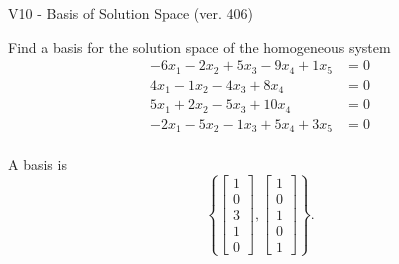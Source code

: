 \begin{exercise}
  \begin{exerciseTitle}V10 - Basis of Solution Space (ver. 406)\end{exerciseTitle}
  \begin{exerciseStatement}
    Find a basis for the solution space of the homogeneous system 
\begin{align*}
 -6 x_ 1 -2 x_ 2 + 5 x_ 3 -9 x_ 4 + 1 x_ 5 &= 0  \\ 
  4 x_ 1 -1 x_ 2 -4 x_ 3 + 8 x_ 4 &= 0  \\ 
  5 x_ 1 + 2 x_ 2 -5 x_ 3 + 10 x_ 4 &= 0  \\ 
  -2 x_ 1 -5 x_ 2 -1 x_ 3 + 5 x_ 4 + 3 x_ 5 &= 0  \\ 
 \end{align*}


 
  \end{exerciseStatement}

  \begin{exerciseAnswer}
   A basis is   
\[\left\{\left[\begin{array}{c}
1 \\
0 \\
3 \\
1 \\
0
\end{array}\right] , \left[\begin{array}{c}
1 \\
0 \\
1 \\
0 \\
1
\end{array}\right]\right\}.\]

  


  \end{exerciseAnswer}
\end{exercise}